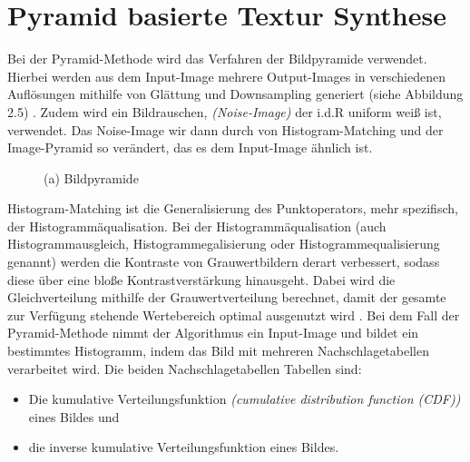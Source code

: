 \documentclass[12pt, a4paper,twoside,openany]{report} %
\begin{document}
\section{Pyramid basierte Textur Synthese}

Bei der Pyramid-Methode wird das Verfahren der Bildpyramide verwendet.
Hierbei werden aus dem Input-Image mehrere Output-Images in verschiedenen Auflösungen mithilfe von Glättung und Downsampling generiert {(siehe Abbildung 2.5)} \cite{Heeger}.
\newline
Zudem wird ein Bildrauschen, \textit{(Noise-Image)} der i.d.R uniform weiß ist, verwendet.
Das Noise-Image wir dann durch von Histogram-Matching und der Image-Pyramid so verändert, das es dem Input-Image ähnlich ist.

\begin{figure}[H]
    \centering
    \caption{(a) Bildpyramide}%
\end{figure}

Histogram-Matching ist die Generalisierung des Punktoperators, mehr spezifisch, der Histogrammäqualisation.
Bei der Histogrammäqualisation {(auch Histogrammausgleich, Histogrammegalisierung oder Histogrammequalisierung genannt)}
werden die Kontraste von Grauwertbildern derart verbessert, sodass diese über eine bloße Kontrastverstärkung hinausgeht.
Dabei wird die Gleichverteilung mithilfe der Grauwertverteilung berechnet, damit der gesamte zur Verfügung stehende Wertebereich optimal ausgenutzt wird \cite{Lehmann2013}.
Bei dem Fall der Pyramid-Methode nimmt der Algorithmus ein Input-Image und bildet ein bestimmtes Histogramm, indem das Bild mit mehreren Nachschlagetabellen verarbeitet wird.
Die beiden Nachschlagetabellen Tabellen sind:

\begin{itemize}
    \itemsep-0.5em
    \item Die kumulative Verteilungsfunktion \textit{(cumulative distribution function (CDF))} eines Bildes und
    \item die inverse kumulative Verteilungsfunktion eines Bildes.
\end{itemize} 
\end{document}
